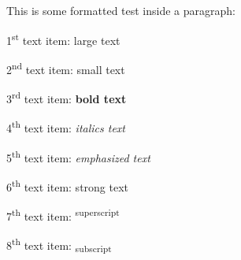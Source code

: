 \documentclass[12pt]{article}
\begin{document}
% 
% 

\begin{paragraph}
This is some formatted test inside a paragraph:
\end{paragraph}

\begin{paragraph}
1\textsuperscript{st} text item: {\Large large text}
\end{paragraph}

\begin{paragraph}
2\textsuperscript{nd} text item: {\scriptsize small text}
\end{paragraph}

\begin{paragraph}
3\textsuperscript{rd} text item: \textbf{bold text}
\end{paragraph}

\begin{paragraph}
4\textsuperscript{th} text item: \textit{italics text}
\end{paragraph}

\begin{paragraph}
5\textsuperscript{th} text item: \emph{emphasized text}
\end{paragraph}

\begin{paragraph}
6\textsuperscript{th} text item: \textmd{strong text}
\end{paragraph}

\begin{paragraph}
7\textsuperscript{th} text item: \textsuperscript{superscript}
\end{paragraph}

\begin{paragraph}
8\textsuperscript{th} text item: \textsubscript{subscript}
\end{paragraph}
\end{document}
